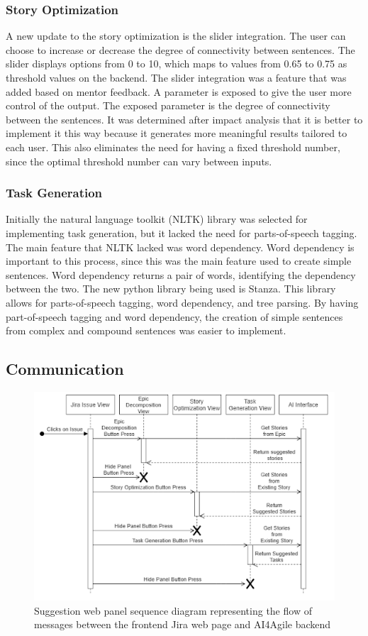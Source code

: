 \subsubsection{Story Optimization}
A new update to the story optimization is the slider integration. The user can choose to increase or decrease the degree of connectivity between sentences. The slider displays options from 0 to 10, which maps to values from 0.65 to 0.75 as threshold values on the backend. The slider integration was a feature that was added based on mentor feedback. A parameter is exposed to give the user more control of the output. The exposed parameter is the degree of connectivity between the sentences. It was determined after impact analysis that it is better to implement it this way because it generates more meaningful results tailored to each user. This also eliminates the need for having a fixed threshold number, since the optimal threshold number can vary between inputs.

\subsubsection{Task Generation}
Initially the natural language toolkit (NLTK) library was selected for implementing task generation, but it lacked the need for parts-of-speech tagging. The main feature that NLTK lacked was word dependency. Word dependency is important to this process, since this was the main feature used to create simple sentences. Word dependency returns a pair of words, identifying the dependency between the two. The new python library being used is Stanza. This library allows for parts-of-speech tagging, word dependency, and tree parsing. By having part-of-speech tagging and word dependency, the creation of simple sentences from complex and compound sentences was easier to implement.

\subsection{Communication}
\begin{figure}
\centerline{\includegraphics[width=\textwidth,height=\textheight,keepaspectratio]{./figure/SequenceFlowDiagram.png}}
\caption{Suggestion web panel sequence diagram representing the flow of messages between the frontend Jira web page and AI4Agile backend}
\end{figure}

